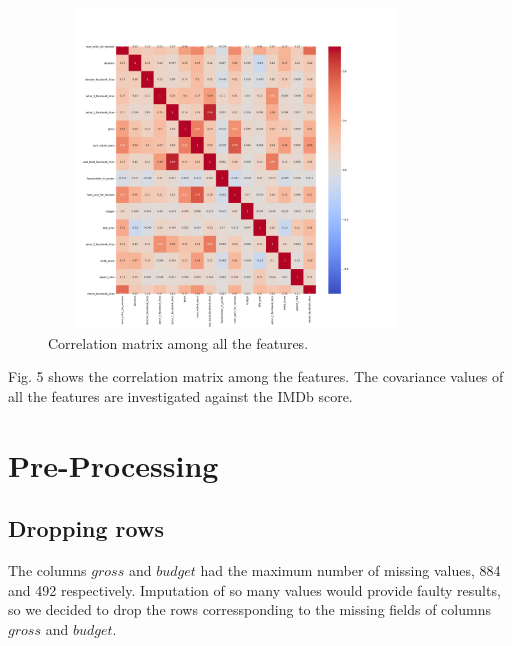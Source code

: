 \documentclass[conference]{IEEEtran}
\begin{document}
\begin{figure}[H]
  \centering	
  \captionsetup{justification=centering}
  \includegraphics[height=8.5cm, width=10cm, trim={20mm 20mm 20mm 40mm},clip]{../visualizations/corr_matrix.png}
  \caption{Correlation matrix among all the features.}
  \label{fig:fig5}
\end{figure}
Fig. 5 shows the correlation matrix among the features. The covariance values of all the features are investigated against the IMDb score.

\newpage
\section{Pre-Processing}
\subsection{Dropping rows}
The columns $gross$ and $budget$ had the maximum number of missing values, 884 and 492 respectively. Imputation of so many values would provide faulty results, so we decided to drop the rows corressponding to the missing fields of columns $gross$ and $budget$.\\
\end{document}
